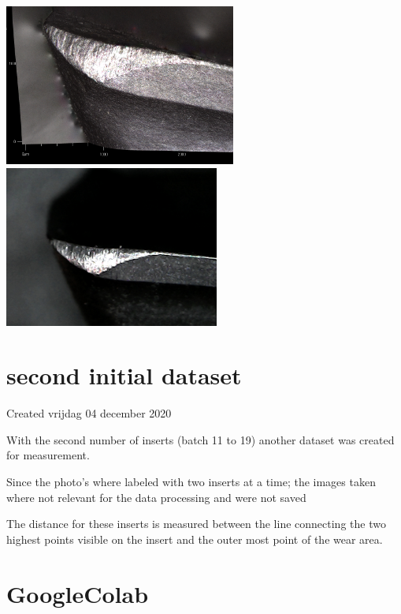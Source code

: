 \documentclass{article}
\begin{document}
\includegraphics[height=2.083333in, keepaspectratio=true]{./ZimFiles_files/Vision/Dataset/handmade_datasets/Second_handmade_dataset/t50b-img.PNG}\includegraphics[height=2.083333in, keepaspectratio=true]{./ZimFiles_files/Vision/Dataset/handmade_datasets/Second_handmade_dataset/b_005_p_010_s.jpg}


		\section{second initial dataset}

Created vrijdag 04 december 2020



With the second number of inserts (batch 11 to 19) another dataset was created for measurement.

Since the photo's where labeled with two inserts at a time; the images taken where not relevant for the data processing and were not saved



The distance for these inserts is measured between the line connecting the two highest points visible on the insert and the outer most point of the wear area.






		\section{GoogleColab}
\end{document}
